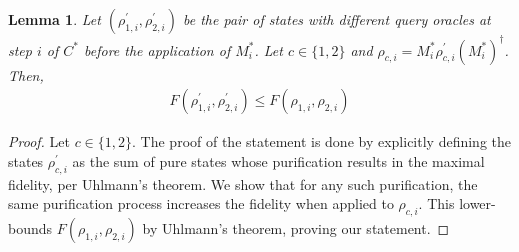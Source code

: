 \documentclass[10pt,a4paper]{article}
\newtheorem{lemma}[theorem]{Lemma}
\begin{document}
\begin{lemma}\label{lemma_fidelity_partial_measurement}
    Let $(\rho^\prime_{1, i}, \rho^\prime_{2, i})$ be the pair of states with different query oracles at step $i$ of $C^*$ before the application of $M^*_i$. Let $c\in \{1,2\}$ and $\rho_{c, i} = M^*_i \rho^\prime_{c, i} (M^*_i)^\dagger$. Then,
    \begin{align*}
        F(\rho^\prime_{1, i}, \rho^\prime_{2, i}) \leq F(\rho_{1,i}, \rho_{2, i})
    \end{align*}
\end{lemma}
\begin{proof}
    Let $c\in \{1,2\}$. The proof of the statement is done by explicitly defining the states $\rho^\prime_{c, i}$ as the sum of pure states whose purification results in the maximal fidelity, per Uhlmann's theorem. We show that for any such purification, the same purification process increases the fidelity when applied to $\rho_{c, i}$. This lower-bounds $F(\rho_{1,i}, \rho_{2, i})$ by Uhlmann's theorem, proving our statement.


\end{proof}
\end{document}
